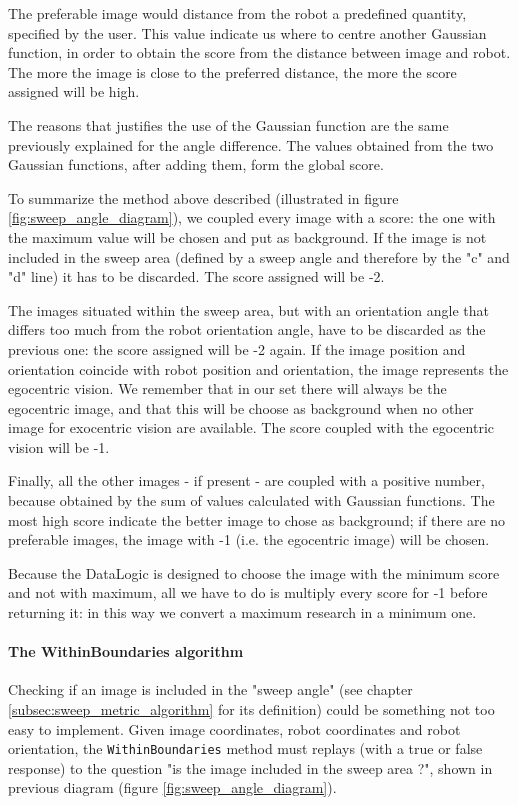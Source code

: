 %
The preferable image would distance from the robot a predefined quantity, specified by the user. This value
indicate us where to centre another Gaussian function, in order to obtain the score from the distance between
image and robot. The more the image is close to the preferred distance, the more the score assigned will be high.
%

%
The reasons that justifies the use of the Gaussian function are the same previously explained for the angle
difference. The values obtained from the two Gaussian functions, after adding them, form the global score.
%

%
To summarize the method above described (illustrated in figure \ref{fig:sweep_angle_diagram}), we coupled
every image with a score: the one with the maximum value will be chosen and put as background. If the image is
not included in the sweep area (defined by a sweep angle and therefore by the "c" and "d" line) it has to be
discarded. The score assigned will be -2.
%

%
The images situated within the sweep area, but with an orientation angle that differs too much from the robot
orientation angle, have to be discarded as the previous one: the score assigned will be -2 again.
If the image position and orientation coincide with robot position and orientation, the image represents the
egocentric vision. We remember that in our set there will always be the egocentric image, and that this will be
choose as background when no other image for exocentric vision are available. The score coupled with the egocentric 
vision will be -1.
%

%
Finally, all the other images - if present - are coupled with a positive number, because obtained by the sum of
values calculated with Gaussian functions. The most high score indicate the better image to chose as background;
if there are no preferable images, the image with -1 (i.e. the egocentric image) will be chosen.
%

%
Because the DataLogic is designed to choose the image with the minimum score and not with maximum, all we have to
do is multiply every score for -1 before returning it: in this way we convert a maximum research in a minimum one.
%

%
\paragraph{The WithinBoundaries algorithm}
\label{par:withinboundaries}

Checking if an image is included in the "sweep angle" (see chapter \ref{subsec:sweep_metric_algorithm} for its
definition) could be something not too easy to implement. Given image coordinates, robot coordinates and robot
orientation, the \texttt{WithinBoundaries} method must replays (with a true or false response) to the question
"is the image included in the sweep area ?", shown in previous diagram (figure \ref{fig:sweep_angle_diagram}).
%

